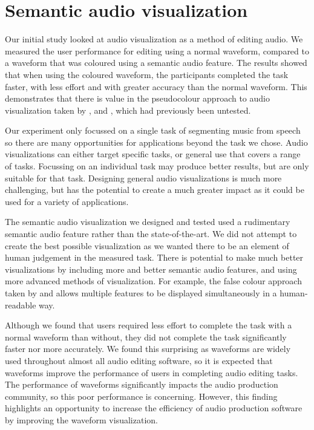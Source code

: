\section{Semantic audio visualization}

Our initial study looked at audio visualization as a method of editing audio. We measured the user performance for
editing using a normal waveform, compared to a waveform that was coloured using a semantic audio feature. The results
showed that when using the coloured waveform, the participants completed the task faster, with less effort and with
greater accuracy than the normal waveform. This demonstrates that there is value in the pseudocolour approach to audio
visualization taken by \citet{Rice2005}, \citet{Akkermans2011} and \citet{Loviscach2011a}, which had previously been
untested.

Our experiment only focussed on a single task of segmenting music from speech so there are many opportunities for
applications beyond the task we chose. Audio visualizations can either target specific tasks, or
general use that covers a range of tasks. Focussing on an individual task may produce better results, but are only suitable
for that task.  Designing general audio visualizations is much more challenging, but has the potential to create a much
greater impact as it could be used for a variety of applications.

The semantic audio visualization we designed and tested used a rudimentary semantic audio feature rather than the
state-of-the-art.  We did not attempt to create the best possible visualization as we wanted there to be an element of
human judgement in the measured task. There is potential to make much better visualizations by including more and
better semantic audio features, and using more advanced methods of visualization. For example, the false colour
approach taken by \citet{Tzanetakis2000} and \citet{Mason2007} allows multiple features to be displayed simultaneously
in a human-readable way.

Although we found that users required less effort to complete the task with a normal waveform than without, they did
not complete the task significantly faster nor more accurately. We found this surprising as waveforms are widely used
throughout almost all audio editing software, so it is expected that waveforms improve the performance of users in
completing audio editing tasks. The performance of waveforms significantly impacts the audio production community, so
this poor performance is concerning. However, this finding highlights an opportunity to increase the efficiency of
audio production software by improving the waveform visualization.

